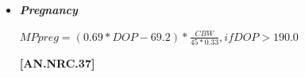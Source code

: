 \documentclass{article}
\begin{document}
\begin{refsection}
\begin{itemize}
            {\raggedleft \textbf{[AN.NRC.32]}\par}

            
        
        \underline {Heifers}
        \vspace{0.2cm}

\begin{center}
    \(Npg = 0, if ADG = 0 ADG * (268 - 29.4 * \frac{NEg}{ADG})\)
\end{center}

\vspace{0.5cm}
            {\raggedleft \textbf{[AN.NRC.33]}\par}
        \vspace{0.2cm}

\begin{center}
    \(EffMP\_NPg = \frac{(83.4 - 0.114 * EQSBW)}{100}, if EQSBW \leq 478, 0
    .28908\)
\end{center}
\vspace{0.5cm}

            {\raggedleft \textbf{[AN.NRC.34]}\par}
\textit{\small Otherwise}
        \vspace{0.2cm}

\begin{center}
    \(MPg = \frac{NPg}{EffMP\_NPg}\)
\end{center}
\vspace{0.5cm}

            {\raggedleft \textbf{[AN.NRC.35]}\par}
\vspace{0.2cm}

\begin{center}
    \(MPreq = MPm + MPg + MPpreg + MPlact\)
\end{center}

\vspace{0.5cm}
            {\raggedleft \textbf{[AN.NRC.36]}\par}
            
\vspace{0.5cm}
                \item \textbf{\textit{Pregnancy}}
\vspace{0.2cm}

\begin{center}
    \(MPpreg = (0.69 * DOP - 69.2) * \frac{CBW}{45 * 0.33}, if DOP > 190.0\)
\end{center}

\vspace{0.5cm}
            {\raggedleft \textbf{[AN.NRC.37]}\par}
\vspace{0.25cm}
            

\end{itemize}
\end{refsection}
\end{document}
